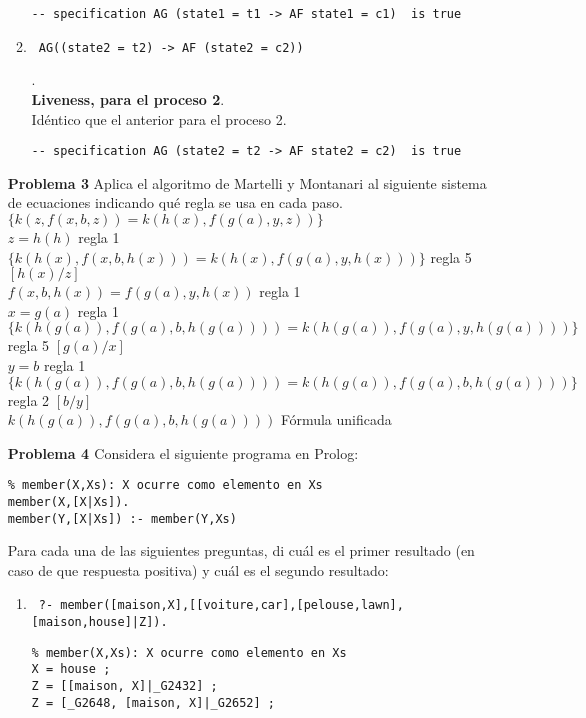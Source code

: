\documentclass{article}
\begin{document}
\begin{enumerate}
\begin{enumerate}
\begin{lstlisting}
-- specification AG (state1 = t1 -> AF state1 = c1)  is true
\end{lstlisting}

\item \begin{verbatim} AG((state2 = t2) -> AF (state2 = c2)) \end{verbatim}.\\
{\bf Liveness, para el proceso 2}.\\
Idéntico que el anterior para el proceso 2.\\
\begin{lstlisting}
-- specification AG (state2 = t2 -> AF state2 = c2)  is true
\end{lstlisting}

\end{enumerate}

\item[\bf{Problema 3}] Aplica el algoritmo de Martelli y Montanari al siguiente sistema de ecuaciones indicando qué regla se usa en cada paso.\\

$\{k(z, f(x, b, z)) = k(h(x), f(g(a), y, z))\}$\\
$z=h(h)$  regla 1\\
$\{k(h(x), f(x, b, h(x))) = k(h(x), f(g(a), y, h(x)))\} $ regla 5 $[h(x)/z]$\\
$f(x, b, h(x)) = f(g(a), y, h(x))$ regla 1\\
$x=g(a)$ regla 1\\
$\{k(h(g(a)), f(g(a), b, h(g(a)))) = k(h(g(a)), f(g(a), y, h(g(a))))\} $ regla 5 $[g(a)/x]$\\
$y=b$ regla 1\\
$\{k(h(g(a)), f(g(a), b, h(g(a)))) = k(h(g(a)), f(g(a), b, h(g(a))))\} $ regla 2 $[b/y]$\\
$k(h(g(a)), f(g(a), b, h(g(a))))$ Fórmula unificada

\item[\bf{Problema 4 }]Considera el siguiente programa en Prolog:
\begin{lstlisting}
% member(X,Xs): X ocurre como elemento en Xs
member(X,[X|Xs]).
member(Y,[X|Xs]) :- member(Y,Xs)
\end{lstlisting}

Para cada una de las siguientes preguntas, di cuál es el primer resultado
(en caso de que respuesta positiva) y cuál es el segundo resultado:

\begin{enumerate}
\item \begin{verbatim} ?- member([maison,X],[[voiture,car],[pelouse,lawn],[maison,house]|Z]). \end{verbatim}
\begin{lstlisting}
% member(X,Xs): X ocurre como elemento en Xs
X = house ;
Z = [[maison, X]|_G2432] ;
Z = [_G2648, [maison, X]|_G2652] ;
\end{lstlisting}


\end{enumerate}
\end{enumerate}
\end{document}
